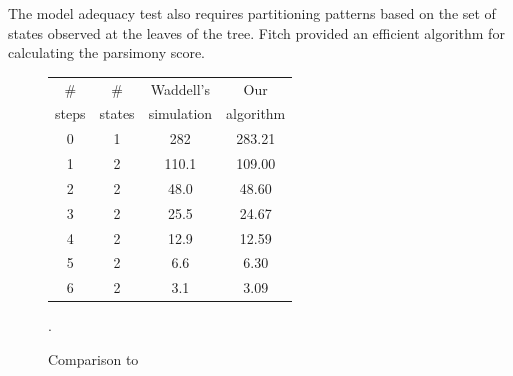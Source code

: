 \documentclass[a0paper,landscape]{baposter}
\begin{document}
\begin{poster}
{The model adequacy test also requires partitioning patterns based on the set of states observed at the leaves of the tree.
Fitch \citep{Fitch1971} provided an efficient algorithm for calculating the parsimony score.
\begin{figure}
\begin{tabular}{|cc|c|c|}
\hline
\# & \#  & Waddell's  & Our \\
 steps & states & simulation &  algorithm\\
\hline
0 & 1 & 282 & 283.21\\
1 & 2 & 110.1 & 109.00\\
2 & 2 & 48.0 & 48.60\\
3 & 2 & 25.5 & 24.67\\
4 & 2 & 12.9 & 12.59\\
5 & 2 & 6.6 & 6.30\\
6 & 2 & 3.1 & 3.09\\
\hline
\end{tabular}
\caption{Comparison to }\label{ComparisonToWaddell}.

\end{figure}

}
\end{poster}
\end{document}

